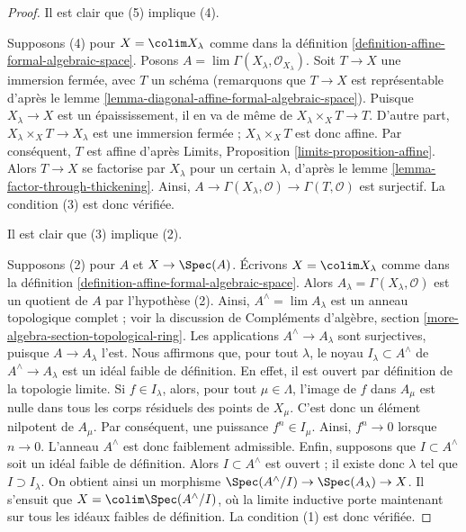 \begin{proof}
Il est clair que (5) implique (4).

\medskip\noindent
Supposons (4) pour $X = \colim X_\lambda$ comme dans
la définition \ref{definition-affine-formal-algebraic-space}.
Posons $A = \lim \Gamma(X_\lambda, \mathcal{O}_{X_\lambda})$.
Soit $T \to X$ une immersion fermée, avec $T$ un schéma
(remarquons que $T \to X$ est représentable d'après
le lemme \ref{lemma-diagonal-affine-formal-algebraic-space}).
Puisque $X_\lambda \to X$ est un épaississement, il en va de même de
$X_\lambda \times_X T \to T$. D'autre part,
$X_\lambda \times_X T \to X_\lambda$ est une immersion fermée ;
$X_\lambda \times_X T$ est donc affine. Par conséquent, $T$ est affine
d'après Limits, Proposition \ref{limits-proposition-affine}.
Alors $T \to X$ se factorise par $X_\lambda$ pour un certain $\lambda$,
d'après le lemme \ref{lemma-factor-through-thickening}.
Ainsi, $A \to \Gamma(X_\lambda, \mathcal{O}) \to \Gamma(T, \mathcal{O})$
est surjectif. La condition (3) est donc vérifiée.

\medskip\noindent
Il est clair que (3) implique (2).

\medskip\noindent
Supposons (2) pour $A$ et $X \to \Spec(A)$. Écrivons $X = \colim X_\lambda$
comme dans la définition \ref{definition-affine-formal-algebraic-space}.
Alors $A_\lambda = \Gamma(X_\lambda, \mathcal{O})$ est un quotient
de $A$ par l'hypothèse (2). Ainsi, $A^\wedge = \lim A_\lambda$
est un anneau topologique complet ; voir la discussion de
Compléments d'algèbre, section \ref{more-algebra-section-topological-ring}.
Les applications $A^\wedge \to A_\lambda$ sont surjectives, puisque $A \to A_\lambda$ l'est.
Nous affirmons que, pour tout $\lambda$, le noyau $I_\lambda \subset A^\wedge$ de
$A^\wedge \to A_\lambda$ est un idéal faible de définition.
En effet, il est ouvert par définition de la topologie limite.
Si $f \in I_\lambda$, alors, pour tout $\mu \in \Lambda$,
l'image de $f$ dans $A_\mu$ est nulle dans tous les corps résiduels
des points de $X_\mu$. C'est donc un élément nilpotent
de $A_\mu$. Par conséquent, une puissance $f^n \in I_\mu$. Ainsi, $f^n \to 0$
lorsque $n \to 0$. L'anneau $A^\wedge$ est donc faiblement admissible.
Enfin, supposons que $I \subset A^\wedge$ soit un idéal faible
de définition. Alors $I \subset A^\wedge$ est ouvert ; il existe donc
$\lambda$ tel que $I \supset I_\lambda$. On obtient ainsi un morphisme
$\Spec(A^\wedge/I) \to \Spec(A_\lambda) \to X$.
Il s'ensuit que $X = \colim \Spec(A^\wedge/I)$, où
la limite inductive porte maintenant sur tous les idéaux faibles de définition.
La condition (1) est donc vérifiée.


\end{proof}
